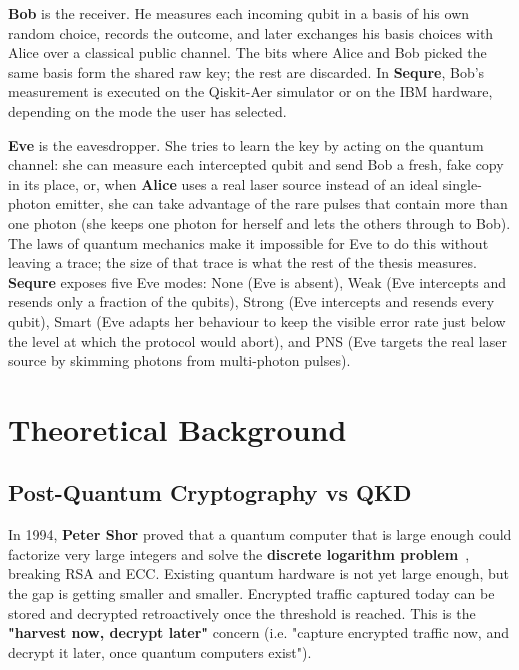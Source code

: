 \documentclass[12pt, a4paper]{article}
\begin{document}
\textbf{Bob} is the receiver. He measures each incoming qubit in
a basis of his own random choice, records the outcome, and later
exchanges his basis choices with Alice over a classical public
channel. The bits where Alice and Bob picked the same basis form the shared raw key; the rest are discarded. In \textbf{Sequre}, Bob's
measurement is executed on the Qiskit-Aer simulator or on the
IBM hardware, depending on the mode the user has selected.

\textbf{Eve} is the eavesdropper. She tries to learn the key by
acting on the quantum channel: she can measure each intercepted qubit and send Bob a fresh, fake copy in its place, or, when \textbf{Alice} uses a real laser source instead of an ideal single-photon emitter, she can take advantage of the rare pulses that contain more than one photon (she keeps one photon for herself and lets the others through to Bob). The laws of quantum mechanics make it impossible for Eve to do this without
leaving a trace; the size of that trace is what the rest of the
thesis measures. \textbf{Sequre} exposes five Eve modes: None
(Eve is absent), Weak (Eve intercepts and resends only a fraction of the qubits), Strong (Eve intercepts and resends every qubit), Smart (Eve adapts her behaviour to keep the visible error rate just below the level at which the protocol would abort), and PNS (Eve targets the real laser source by skimming photons from multi-photon pulses).




\newpage
\section{Theoretical Background}
\label{sec:background}

\subsection{Post-Quantum Cryptography vs QKD}
\label{sec:pqc-vs-qkd}

In 1994, \textbf{Peter Shor} proved that a quantum computer that is large enough could factorize very large integers and solve the \textbf{discrete logarithm problem}~\cite{shor1994}, breaking RSA and ECC. Existing quantum hardware is not yet large enough, but the gap is getting smaller and smaller. Encrypted traffic captured today can be stored and decrypted retroactively once the threshold is reached. This is the \textbf{"harvest now, decrypt later"} concern (i.e. "capture encrypted traffic now, and decrypt it later, once quantum computers exist").
\end{document}
